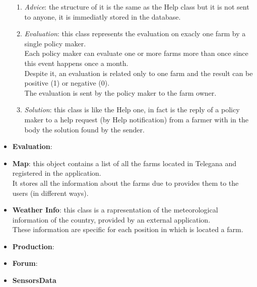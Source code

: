 \begin{itemize}
\begin{enumerate}
            \item \textsl{Advice}: the structure of it is the same as the Help class but it is not sent to anyone,
             it is immediatly stored in the database.
            \item \textsl{Evaluation}: this class represents the evaluation on exacly one farm by a single policy maker.\\ Each policy maker can evaluate one or more 
            farms more than once since this event happens once a month.\\ Despite it, an evaluation is related only to one farm and the result can be positive (1) or negative (0).\\ The evaluation is sent by the policy maker to the farm owner.
            \item \textsl{Solution}: this class is like the Help one, in fact is the reply of a policy maker to a help request (by Help notification) from a farmer with in the body the solution found by the sender.
        \end{enumerate}
    \item \textbf{Evaluation}:
    \item \textbf{Map}: this object contains a list of all the farms located in Telegana and registered in the application.\\It stores all the information about the farms due to provides them to the users (in different ways).
    \item \textbf{Weather Info}: this class is a rapresentation of the meteorological information of the country, provided by an external application.\\These information are specific for each position in which is located a farm.
    \item \textbf{Production}:
    \item \textbf{Forum}:
    \item \textbf{SensorsData}
\end{itemize}
